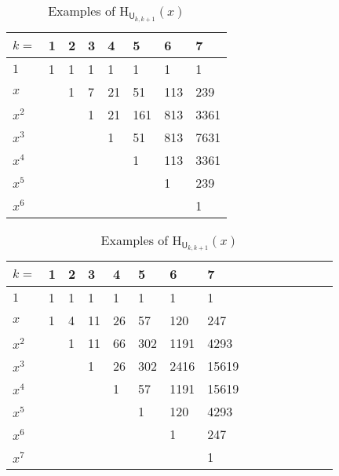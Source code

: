 \documentclass[11pt, a4paper, english]{amsart}
\theoremstyle{teoremas}
\theoremstyle{definition}
\newcommand{\M}{\mathsf{M}}
\newcommand{\U}{\mathsf{U}}
\renewcommand{\H}{\mathrm{H}}
\newcommand{\uH}{\underline{\mathrm{H}}}
\begin{document}
\begin{table}[htb]%
    \caption{Examples of $\uH_{\M}(x)$ and $\H_{\M}(x)$ for some uniform matroids $\M$}
    \begin{subtable}[t]{.5\textwidth}
        \caption{Examples of $\uH_{\U_{k,k+1}}(x)$}
        \raggedright
            \begin{tabular}{l l l l l l l l}\hline
$k=$      & 1   & 2 & 3 & 4 & 5 & 6 & 7  \\ \hline
 $1$      & 1   & 1  & 1  & 1  & 1  & 1  & 1   \\
 $x$      &     & 1  & 7  & 21  & 51  &  113 & 239  \\
 $x^2$    &     &   &  1   & 21  & 161  & 813  & 3361   \\
 $x^3$    &     &   &     & 1  & 51  & 813  & 7631   \\
 $x^4$    &     &   &     &    &  1  & 113  & 3361    \\
 $x^5$    &     &   &   &   &   &  1&  239  \\
 $x^6$    &     &   &   &   &   &   &   1
\end{tabular}
    \end{subtable}%
   \begin{subtable}[t]{.5\textwidth}
        \raggedleft
        \caption{Examples of $\H_{\U_{k,k+1}}(x)$}
        \begin{tabular}{l l l l l l l l l l l l l l l}\hline
$k=$   & 1   & 2 & 3 & 4 & 5 & 6 & 7   \\ \hline
$1$  & 1 & 1 & 1 & 1 & 1 & 1 & 1 \\
$x$  & 1 & 4 & 11 & 26 & 57 & 120 & 247 \\
$x^2$  &  & 1 & 11 & 66 & 302 & 1191 & 4293 \\
$x^3$  &  &  & 1 & 26 & 302 & 2416 & 15619 \\
$x^4$  &  &  &  & 1 & 57 & 1191 & 15619 \\
$x^5$  &  &  &  &  & 1 & 120 & 4293\\
$x^6$  &  &  &  &  &  & 1 & 247 \\
$x^7$  &  &  &  &  &  &  & 1
\end{tabular}
    \end{subtable}
\vspace{2mm}


\end{table}
\end{document}
